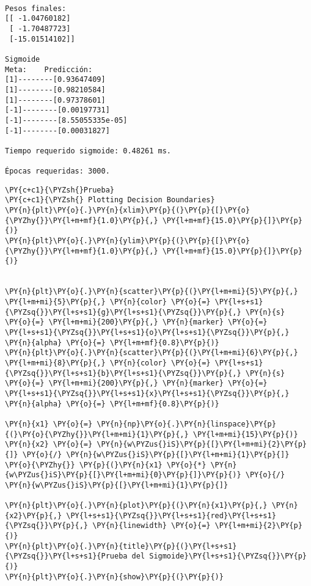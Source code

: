    \begin{Verbatim}[commandchars=\\\{\}]

Pesos finales:
[[ -1.04760182]
 [ -1.70487723]
 [-15.01514102]]

Sigmoide
Meta:    Predicción:
[1]--------[0.93647409]
[1]--------[0.98210584]
[1]--------[0.97378601]
[-1]--------[0.00197731]
[-1]--------[8.55055335e-05]
[-1]--------[0.00031827]

Tiempo requerido sigmoide: 0.48261 ms.

Épocas requeridas: 3000.

    \end{Verbatim}

    \begin{tcolorbox}[breakable, size=fbox, boxrule=1pt, pad at break*=1mm,colback=cellbackground, colframe=cellborder]
\begin{Verbatim}[commandchars=\\\{\}]
\PY{c+c1}{\PYZsh{}Prueba}
\PY{c+c1}{\PYZsh{} Plotting Decision Boundaries}
\PY{n}{plt}\PY{o}{.}\PY{n}{xlim}\PY{p}{(}\PY{p}{[}\PY{o}{\PYZhy{}}\PY{l+m+mf}{1.0}\PY{p}{,} \PY{l+m+mf}{15.0}\PY{p}{]}\PY{p}{)}
\PY{n}{plt}\PY{o}{.}\PY{n}{ylim}\PY{p}{(}\PY{p}{[}\PY{o}{\PYZhy{}}\PY{l+m+mf}{1.0}\PY{p}{,} \PY{l+m+mf}{15.0}\PY{p}{]}\PY{p}{)}


\PY{n}{plt}\PY{o}{.}\PY{n}{scatter}\PY{p}{(}\PY{l+m+mi}{5}\PY{p}{,} \PY{l+m+mi}{5}\PY{p}{,} \PY{n}{color} \PY{o}{=} \PY{l+s+s1}{\PYZsq{}}\PY{l+s+s1}{g}\PY{l+s+s1}{\PYZsq{}}\PY{p}{,} \PY{n}{s} \PY{o}{=} \PY{l+m+mi}{200}\PY{p}{,} \PY{n}{marker} \PY{o}{=} \PY{l+s+s1}{\PYZsq{}}\PY{l+s+s1}{o}\PY{l+s+s1}{\PYZsq{}}\PY{p}{,} \PY{n}{alpha} \PY{o}{=} \PY{l+m+mf}{0.8}\PY{p}{)}
\PY{n}{plt}\PY{o}{.}\PY{n}{scatter}\PY{p}{(}\PY{l+m+mi}{6}\PY{p}{,} \PY{l+m+mi}{8}\PY{p}{,} \PY{n}{color} \PY{o}{=} \PY{l+s+s1}{\PYZsq{}}\PY{l+s+s1}{b}\PY{l+s+s1}{\PYZsq{}}\PY{p}{,} \PY{n}{s} \PY{o}{=} \PY{l+m+mi}{200}\PY{p}{,} \PY{n}{marker} \PY{o}{=} \PY{l+s+s1}{\PYZsq{}}\PY{l+s+s1}{x}\PY{l+s+s1}{\PYZsq{}}\PY{p}{,} \PY{n}{alpha} \PY{o}{=} \PY{l+m+mf}{0.8}\PY{p}{)}

\PY{n}{x1} \PY{o}{=} \PY{n}{np}\PY{o}{.}\PY{n}{linspace}\PY{p}{(}\PY{o}{\PYZhy{}}\PY{l+m+mi}{1}\PY{p}{,} \PY{l+m+mi}{15}\PY{p}{)}
\PY{n}{x2} \PY{o}{=} \PY{n}{w\PYZus{}iS}\PY{p}{[}\PY{l+m+mi}{2}\PY{p}{]} \PY{o}{/} \PY{n}{w\PYZus{}iS}\PY{p}{[}\PY{l+m+mi}{1}\PY{p}{]} \PY{o}{\PYZhy{}} \PY{p}{(}\PY{n}{x1} \PY{o}{*} \PY{n}{w\PYZus{}iS}\PY{p}{[}\PY{l+m+mi}{0}\PY{p}{]}\PY{p}{)} \PY{o}{/} \PY{n}{w\PYZus{}iS}\PY{p}{[}\PY{l+m+mi}{1}\PY{p}{]}

\PY{n}{plt}\PY{o}{.}\PY{n}{plot}\PY{p}{(}\PY{n}{x1}\PY{p}{,} \PY{n}{x2}\PY{p}{,} \PY{l+s+s1}{\PYZsq{}}\PY{l+s+s1}{red}\PY{l+s+s1}{\PYZsq{}}\PY{p}{,} \PY{n}{linewidth} \PY{o}{=} \PY{l+m+mi}{2}\PY{p}{)}
\PY{n}{plt}\PY{o}{.}\PY{n}{title}\PY{p}{(}\PY{l+s+s1}{\PYZsq{}}\PY{l+s+s1}{Prueba del Sigmoide}\PY{l+s+s1}{\PYZsq{}}\PY{p}{)}
\PY{n}{plt}\PY{o}{.}\PY{n}{show}\PY{p}{(}\PY{p}{)}
\end{Verbatim}
\end{tcolorbox}

    \begin{center}
    \end{center}
    { \hspace*{\fill} \\}
    

